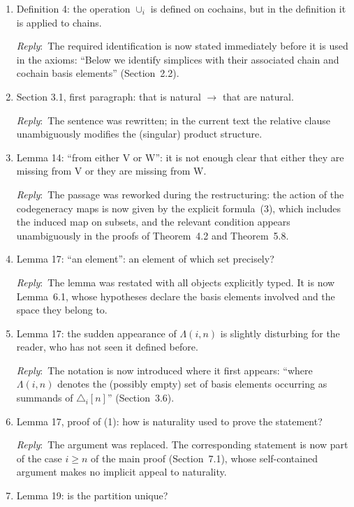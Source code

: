 \documentclass{amsart}
\newcommand{\ar}{\medskip\noindent\textit{Reply}:\ }
\begin{document}
	\begin{enumerate}
		\item Definition 4: the operation \(\cup_i\) is defined on cochains, but in the definition it is applied to chains.

		\ar The required identification is now stated immediately before it is used in the axioms: ``Below we identify simplices with their associated chain and cochain basis elements'' (Section~2.2).

		\item Section 3.1, first paragraph: that is natural \(\rightarrow\) that are natural.

		\ar The sentence was rewritten; in the current text the relative clause unambiguously modifies the (singular) product structure.

		\item Lemma 14: ``from either V or W'': it is not enough clear that either they are missing from V or they are missing from W.

		\ar The passage was reworked during the restructuring: the action of the codegeneracy maps is now given by the explicit formula~(3), which includes the induced map on subsets, and the relevant condition appears unambiguously in the proofs of Theorem~4.2 and Theorem~5.8.

		\item Lemma 17: ``an element'': an element of which set precisely?

		\ar The lemma was restated with all objects explicitly typed.
		It is now Lemma~6.1, whose hypotheses declare the basis elements involved and the space they belong to.

		\item Lemma 17: the sudden appearance of \(\Lambda(i, n)\) is slightly disturbing for the reader, who has not seen it defined before.

		\ar The notation is now introduced where it first appears: ``where $\Lambda(i,n)$ denotes the (possibly empty) set of basis elements occurring as summands of $\triangle_i[n]$'' (Section~3.6).

		\item Lemma 17, proof of (1): how is naturality used to prove the statement?

		\ar The argument was replaced.
		The corresponding statement is now part of the case $i \geq n$ of the main proof (Section~7.1), whose self-contained argument makes no implicit appeal to naturality.

		\item Lemma 19: is the partition unique?


\end{enumerate}
\end{document}
